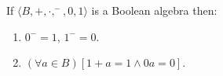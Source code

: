 If $\langle B, +, \cdot, ^-, 0, 1 \rangle$ is a Boolean algebra then:
\begin{enumerate}
\item $0^- = 1$, \quad $1^- = 0.$
\item $(\forall a \in B)[1 + a = 1 \land 0a = 0]$.
\end{enumerate}
